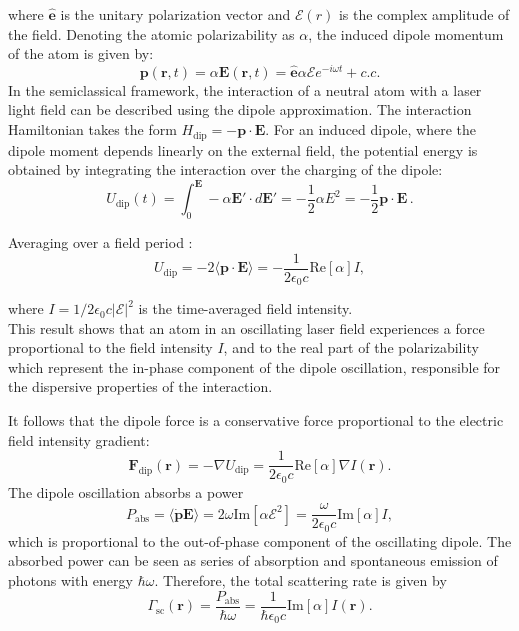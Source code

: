 where $\mathbf{\hat{e}}$ is the unitary polarization vector and $\mathcal{E}(r)$ is the complex amplitude of the field. Denoting the atomic polarizability as $\alpha$, the induced dipole momentum of the atom is given by:
\begin{equation}
    \mathbf{p}(\mathbf{r}, t) = \alpha \mathbf{E}(\mathbf{r},t) = \hat{\mathbf{e}} \alpha \mathcal{E}e^{-i\omega t} + c.c. 
\end{equation}
In the semiclassical framework, the interaction of a neutral atom with a laser light field can be described using the dipole approximation. The interaction Hamiltonian takes the form $H_\text{dip} = - \mathbf{p \cdot E}$. For an induced dipole, where the dipole moment depends linearly on the external field, the potential energy is obtained by integrating the interaction over the charging of the dipole:
\begin{equation}
    U_\text{dip}(t) = \int_0^\mathbf{E} -\alpha \mathbf{E'}\cdot d \mathbf{E'} = -\frac{1}{2} \alpha E^2 = - \frac{1}{2} \mathbf{p \cdot E} \,. 
\end{equation}

Averaging over a field period \cite{grimm}:
\begin{equation}
    \label{eq:dipole_potential_alpha}
    U_\text{dip}= -2 \langle \mathbf{p \cdot E}\rangle= -\frac{1}{2\epsilon_0 c} \text{Re}[\alpha]I,
\end{equation}

where $I=1/2 \epsilon_0 c |\mathcal{E}|^2$ is the time-averaged field intensity.\\
This result shows that an atom in an oscillating laser field experiences a force proportional to the field intensity $I$, and to the real part of the polarizability which represent the in-phase component of the dipole oscillation, responsible for the dispersive properties of the interaction.

It follows that the dipole force is a conservative force proportional to the electric field intensity gradient:
\begin{equation}
    \mathbf{F}_\text{dip} (\mathbf{r}) = -\nabla U_\text{dip} = \frac{1}{2\epsilon_0 c} \text{Re}[\alpha] \nabla I(\mathbf{r}).
\end{equation}
The dipole oscillation absorbs a power
\begin{equation}
    P_\text{abs} = \langle\mathbf{\dot{p}E}\rangle = 2\omega \text{Im}[\alpha \mathcal{E}^2] = \frac{\omega}{2\epsilon_0 c}\text{Im}[\alpha] I,
\end{equation}
which is proportional to the out-of-phase component of the oscillating dipole. The absorbed power can be seen as series of absorption and spontaneous emission of photons with energy $\hbar\omega$. Therefore, the total scattering rate is given by
\begin{equation}
    \label{eq:scattering_rate_alpah}
    \Gamma_\text{sc} (\mathbf{r})=\frac{P_\text{abs}}{\hbar\omega}=\frac{1}{\hbar\epsilon_0 c}\text{Im} [\alpha] I(\mathbf{r}).
\end{equation}

